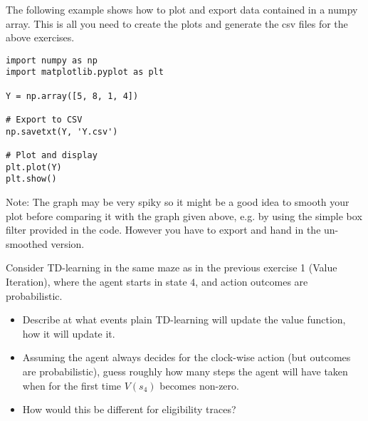The following example shows how to plot and export data contained in a
numpy array. This is all you need to
create the plots and generate the csv files for the above exercises.

\begin{shaded}
\begin{verbatim}
import numpy as np
import matplotlib.pyplot as plt

Y = np.array([5, 8, 1, 4])

# Export to CSV
np.savetxt(Y, 'Y.csv')

# Plot and display
plt.plot(Y)
plt.show()
\end{verbatim}
\end{shaded}

Note: The graph may be very spiky so it might be a good idea to smooth your plot before comparing it with the graph given above, e.g. by using the simple box filter provided in the code. However you have to export and hand in the un-smoothed version.



Consider TD-learning in the same maze as in the previous exercise 1
(Value Iteration), where the agent starts in state $4$, and action
outcomes are probabilistic.
\begin{itemize}
\item Describe at what events plain TD-learning
will update the value function, how it will update it.
\item Assuming the
agent always decides for the clock-wise action (but outcomes are probabilistic), guess roughly how many steps
the agent will have taken when for the first time $V(s_4)$ becomes
non-zero.
\item How would this be different for eligibility traces?
\end{itemize}



\exerfoot

